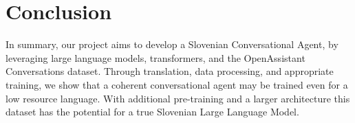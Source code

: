 \documentclass[fleqn,moreauthors,10pt]{ds_report}
\begin{document}
\section*{Conclusion}
 In summary, our project aims to develop a Slovenian Conversational Agent, by leveraging large language models, transformers, and the OpenAssistant Conversations dataset. Through translation, data processing, and appropriate training, we show that a coherent conversational agent may be trained even for a low resource language. With additional pre-training and a larger architecture this dataset has the potential for a true Slovenian Large Language Model.





\clearpage


\end{document}
